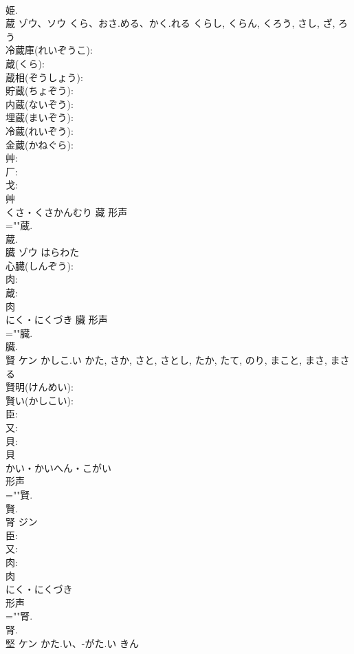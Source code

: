 \documentclass[8pt]{extreport}
\begin{document}
\begin{CJK}{UTF8}{min}
\\	姫.
\\	蔵	ゾウ、ソウ	くら、おさ.める、かく.れる	くらし, くらん, くろう, さし, ざ, ろう	
\\	冷蔵庫(れいぞうこ): 
\\	蔵(くら): 
\\	蔵相(ぞうしょう): 
\\	貯蔵(ちょぞう): 
\\	内蔵(ないぞう): 
\\	埋蔵(まいぞう): 
\\	冷蔵(れいぞう): 
\\	金蔵(かねぐら): 
\\	艸: 
\\	厂: 
\\	戈: 
\\	艸	
\\	くさ・くさかんむり	藏	形声 
\\	=""蔵.
\\	蔵.
\\	臓	ゾウ	はらわた		
\\	心臓(しんぞう): 
\\	肉: 
\\	蔵: 
\\	肉	
\\	にく・にくづき	臟	形声 
\\	=""臓.
\\	臓.
\\	賢	ケン	かしこ.い	かた, さか, さと, さとし, たか, たて, のり, まこと, まさ, まさる	
\\	賢明(けんめい): 
\\	賢い(かしこい): 
\\	臣: 
\\	又: 
\\	貝: 
\\	貝	
\\	かい・かいへん・こがい	
\\	形声 
\\	=""賢.
\\	賢.
\\	腎	ジン			
\\	臣: 
\\	又: 
\\	肉: 
\\	肉	
\\	にく・にくづき	
\\	形声 
\\	=""腎.
\\	腎.
\\	堅	ケン	かた.い、-がた.い	きん	

\end{CJK}
\end{document}
